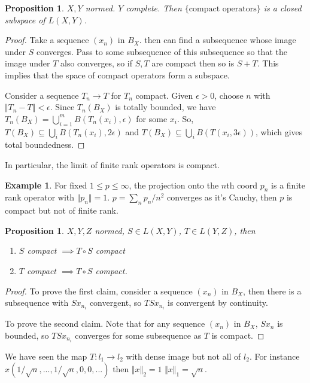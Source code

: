 \documentclass{article}
\theoremstyle{definition}
\newtheorem{example}[defn]{Example}
\theoremstyle{remark}
\theoremstyle{plain}
\newtheorem{prop}[defn]{Proposition}
\begin{document}
\begin{prop}
    $X,Y$ normed. $Y$ complete. Then $\{\text{compact operators}\}$ is a closed subspace of $L(X,Y)$.
\end{prop}
\begin{proof}
    Take a sequence $(x_n)$ in $B_X$. then can find a subsequence whose image under $S$ converges. Pass to some subsequence of this subsequence so that the image under $T$ also converges, so if $S,T$ are compact then so is $S+T$. This implies that the space of compact operators form a subspace.

    Consider a sequence $T_n\to T$ for $T_n$ compact. Given $\epsilon>0$, choose $n$ with $\Vert T_n-T\Vert<\epsilon$. Since $T_n(B_X)$ is totally bounded, we have $T_n(B_X)=\bigcup_{i=1}^mB(T_n(x_i),\epsilon)$ for some $x_i$. So, $T(B_X)\subseteq\bigcup_iB(T_n(x_i),2\epsilon)$ and $T(B_X)\subseteq\bigcup_i B(T(x_i,3\epsilon))$, which gives total boundedness. 
\end{proof}
In particular, the limit of finite rank operators is compact.
\begin{example}
    For fixed $1\le p\le\infty$, the projection onto the $n$th coord $p_n$ is a finite rank operator with $\Vert p_n\Vert=1$. $p=\sum_np_n/n^2$ converges as it's Cauchy, then $p$ is compact but not of finite rank.
\end{example}
\begin{prop}
    $X,Y,Z$ normed, $S\in L(X,Y)$, $T\in L(Y,Z)$, then
    \begin{enumerate}
        \item $S$ compact $\implies T\circ S$ compact
        \item $T$ compact $\implies T\circ S$ compact.
    \end{enumerate}
\end{prop}
\begin{proof}
    To prove the first claim, consider a sequence $(x_n)$ in $B_X$, then there is a subsequence with $S{x_{n_i}}$ convergent, so $TSx_{n_i}$ is convergent by continuity.

    To prove the second claim. Note that for any sequence $(x_n)$ in $B_X$, $Sx_n$ is bounded, so $TSx_{n_i}$ converges for some subsequence as $T$ is compact.
\end{proof}
We have seen the map $T:l_1\to l_2$ with dense image but not all of $l_2$. For instance $x(1/\sqrt{n},...,1/\sqrt{n},0,0,...)$ then $\Vert x\Vert_2=1$ $\Vert x\Vert_1=\sqrt{n}$.
\end{document}
